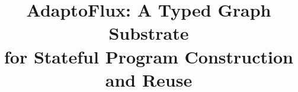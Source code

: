 \documentclass{article} %
\title{AdaptoFlux: A Typed Graph Substrate\\for Stateful Program Construction and Reuse}
\begin{document}
\maketitle



\clearpage
\appendix

\par\medskip

\end{document}
